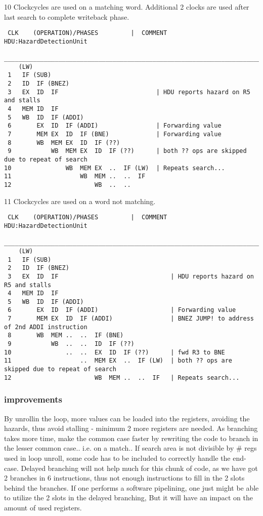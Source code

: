 \documentclass[a4paper,10pt]{article}
\begin{document}
10 Clockcycles are used on a matching word. Additional 2 clocks are used after last search to complete writeback phase.
\begin{verbatim}
 CLK    (OPERATION)/PHASES         |  COMMENT   HDU:HazardDetectionUnit
 ________________________________________________________________________________________________
    (LW)  
 1   IF (SUB)
 2   ID  IF (BNEZ) 
 3   EX  ID  IF                           | HDU reports hazard on R5 and stalls
 4   MEM ID  IF     
 5   WB  ID  IF (ADDI)
 6       EX  ID  IF (ADDI)                | Forwarding value
 7       MEM EX  ID  IF (BNE)             | Forwarding value
 8       WB  MEM EX  ID  IF (??)
 9           WB  MEM EX  ID  IF (??)      | both ?? ops are skipped due to repeat of search
10               WB  MEM EX  ..  IF (LW)  | Repeats search...
11                   WB  MEM ..  ..  IF    
12                       WB  ..  ..
\end{verbatim}


11 Clockcycles are used on a word not matching.
\begin{verbatim}
 CLK    (OPERATION)/PHASES         |  COMMENT   HDU:HazardDetectionUnit
 ________________________________________________________________________________________________
    (LW)  
 1   IF (SUB)
 2   ID  IF (BNEZ) 
 3   EX  ID  IF                               | HDU reports hazard on R5 and stalls
 4   MEM ID  IF     
 5   WB  ID  IF (ADDI)                    
 6       EX  ID  IF (ADDI)                    | Forwarding value
 7       MEM EX  ID  IF (ADDI)                | BNEZ JUMP! to address of 2nd ADDI instruction
 8       WB  MEM ..  ..  IF (BNE)
 9           WB  ..  ..  ID  IF (??)      
10               ..  ..  EX  ID  IF (??)      | fwd R3 to BNE
11                   ..  MEM EX  ..  IF (LW)  | both ?? ops are skipped due to repeat of search
12                       WB  MEM ..  ..  IF   | Repeats search...
\end{verbatim}

\subsubsection{improvements}
By unrollin the loop, more values can be loaded into the registers, avoiding the hazards, thus avoid stalling - minimum 2 more registers are needed.
As branching takes more time, make the common case faster by rewriting the code to branch in the lesser common case.. i.e. on a match..
If search area is not divisible by \# regs used in loop unroll, some code has to be included to correctly handle the end-case.
Delayed branching will not help much for this chunk of code, as we have got 2 branches in 6 instructions, thus not enough instructions to fill in the 2 slots behind the branches.
If one performs a software pipelining, one just might be able to utilize the 2 slots in the delayed branching, But it will have an impact on the amount of used registers.
\end{document}
